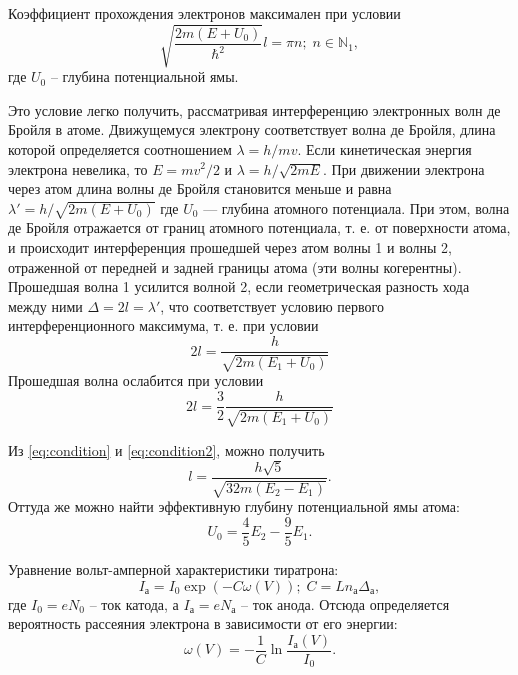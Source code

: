 \documentclass[a4paper, 12pt]{article}
\begin{document}
Коэффициент прохождения электронов максимален при условии
\begin{equation}\label{eq:at}
	\sqrt{\frac{2 m (E+U_0)}{\hbar^2}}l = \pi n;\; n \in \mathbb{N}_1,
\end{equation}
где $ U_0 $ -- глубина потенциальной ямы.

Это условие легко получить, рассматривая интерференцию электронных волн де Бройля в атоме. Движущемуся электрону соответствует волна де Бройля, длина которой определяется соотношением $ \lambda = h/m v $. Если кинетическая энергия электрона невелика, то $ E = m v^2/2 $ и $ \lambda = h/\sqrt{2 m E} $. При движении электрона через атом длина волны де Бройля становится меньше и равна $ \lambda' = h/\sqrt{2 m (E+U_0)} $ где $ U_0 $ — глубина атомного потенциала. При этом, волна де Бройля отражается от границ атомного потенциала, т. е. от поверхности атома, и происходит интерференция прошедшей через атом волны 1 и волны 2, отраженной от передней и задней границы атома (эти волны когерентны). Прошедшая волна 1 усилится волной 2, если геометрическая разность хода между ними $ \Delta = 2 l = \lambda' $, что соответствует условию первого интерференционного максимума, т. е. при условии
\begin{equation}\label{eq:condition}
	2 l = \frac{h}{\sqrt{2 m (E_1 + U_0)}}
\end{equation}
Прошедшая волна ослабится при условии
\begin{equation}\label{eq:condition2}
	2 l = \frac{3}{2}\frac{h}{\sqrt{2 m (E_1 + U_0)}}
\end{equation}

Из \eqref{eq:condition} и \eqref{eq:condition2}, можно получить
\begin{equation}\label{eq:radius}
	l = \frac{h \sqrt{5}}{\sqrt{32 m (E_2-E_1)}}.
\end{equation}
Оттуда же можно найти эффективную глубину потенциальной ямы атома:
\begin{equation}\label{eq:atomPit}
	U_0 = \frac{4}{5}E_2-\frac{9}{5} E_1.
\end{equation}

Уравнение вольт-амперной характеристики тиратрона:
\begin{equation}\label{eq:VAH}
	I_а = I_0 \exp (-C \omega (V));\; C = L n_а \Delta_а,
\end{equation}
где $ I_0 = e N_0 $ -- ток катода, а $ I_а = e N_а $ -- ток анода.
Отсюда определяется вероятность рассеяния электрона в зависимости от его энергии:
\begin{equation}\label{eq:probable}
	\omega (V) = -\frac{1}{C} \ln \frac{I_а(V)}{I_0}.
\end{equation}
\end{document}
